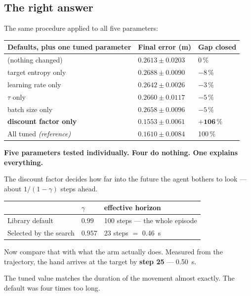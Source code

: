 \subsection{The right answer}

The same procedure applied to all five parameters:

\begin{center}
\begin{tabular}{@{} L{6.8cm} C{3.4cm} C{2.4cm} @{}}
\toprule
\textbf{Defaults, plus one tuned parameter} & \textbf{Final error (m)} & \textbf{Gap closed} \\
\midrule
(nothing changed) & $0.2613 \pm 0.0203$ & 0\,\% \\
target entropy only & $0.2688 \pm 0.0090$ & $-8$\,\% \\
learning rate only & $0.2642 \pm 0.0026$ & $-3$\,\% \\
$\tau$ only & $0.2660 \pm 0.0117$ & $-5$\,\% \\
batch size only & $0.2658 \pm 0.0096$ & $-5$\,\% \\
\textbf{discount factor only} & $\mathbf{0.1553 \pm 0.0061}$ & $\mathbf{+106}$\,\% \\
\midrule
All tuned \emph{(reference)} & $0.1610 \pm 0.0084$ & 100\,\% \\
\bottomrule
\end{tabular}
\end{center}

\textbf{Five parameters tested individually. Four do nothing. One explains
everything.}

\begin{plain}
The discount factor decides how far into the future the agent bothers to look ---
about $1/(1-\gamma)$ steps ahead.

\begin{center}
\begin{tabular}{@{} L{5.4cm} C{2.4cm} C{5.0cm} @{}}
\toprule
& $\gamma$ & \textbf{effective horizon} \\
\midrule
Library default & $0.99$ & 100 steps --- the whole episode \\
Selected by the search & $0.957$ & 23 steps $=$ \SI{0.46}{\second} \\
\bottomrule
\end{tabular}
\end{center}

Now compare that with what the arm actually does. Measured from the trajectory,
the hand arrives at the target by \textbf{step 25} --- \SI{0.50}{\second}.

The tuned value matches the duration of the movement almost exactly. The default
was four times too long.
\end{plain}

